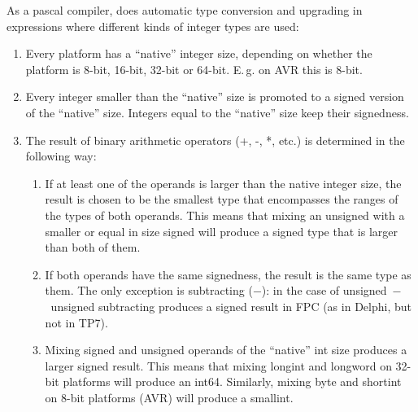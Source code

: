 As a pascal compiler, \fpc does automatic type conversion and upgrading
in expressions where different kinds of integer types are used:
\begin{enumerate}
\item Every platform has a ``native'' integer size, depending on whether the
platform is 8-bit, 16-bit, 32-bit or 64-bit. E.\,g. on AVR this is 8-bit.
\item Every integer smaller than the ``native'' size is promoted to a signed
version of the ``native'' size. Integers equal to the ``native'' size keep their
signedness.
\item The result of binary arithmetic operators (+, -, *, etc.) is determined
in the following way:
\begin{enumerate}
\item If at least one of the operands is larger than the native integer size,
the result is chosen to be the smallest type that encompasses the ranges of
the types of both operands. This means that mixing an unsigned with a
smaller or equal in size signed will produce a signed type that is larger
than both of them.
\item If both operands have the same signedness, the result is the same
type as them. The only exception is subtracting ($-$): in the case of unsigned~$-$~unsigned
subtracting produces a signed result in FPC (as in Delphi, but not in TP7).
\item Mixing signed and unsigned operands of the ``native'' int size produces
a larger signed result. This means that mixing longint and longword on
32-bit platforms will produce an int64. Similarly, mixing byte and shortint on
8-bit platforms (AVR) will produce a smallint.
\end{enumerate}
\end{enumerate}

%
%
